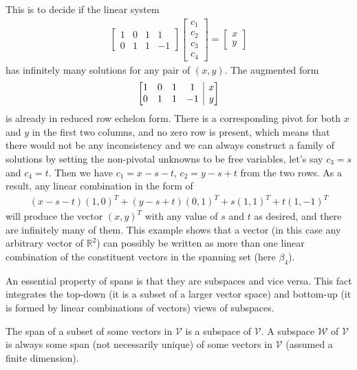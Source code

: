 \begin{solution}
This is to decide if the linear system
\begin{align*}
\begin{bmatrix}
1 & 0 & 1 & 1 \\
0 & 1 & 1 & -1
\end{bmatrix}
\begin{bmatrix}
c_1 \\
c_2 \\
c_3 \\
c_4
\end{bmatrix}
=
\begin{bmatrix}
x \\
y
\end{bmatrix}    
\end{align*}
has infinitely many solutions for any pair of $(x,y)$. The augmented form
\begin{align*}
\left[\begin{array}{@{}cccc|c@{}}
1 & 0 & 1 & 1 & x \\
0 & 1 & 1 & -1 & y
\end{array}\right]
\end{align*}
is already in reduced row echelon form. There is a corresponding pivot for both $x$ and $y$ in the first two columns, and no zero row is present, which means that there would not be any inconsistency and we can always construct a family of solutions by setting the non-pivotal unknowns to be free variables, let's say $c_3 = s$ and $c_4 = t$. Then we have $c_1 = x - s - t$, $c_2 = y - s + t$ from the two rows. As a result, any linear combination in the form of
\begin{align*}
(x-s-t)(1,0)^T + (y-s+t)(0,1)^T + s(1,1)^T + t(1,-1)^T
\end{align*}
will produce the vector $(x,y)^T$ with any value of $s$ and $t$ as desired, and there are infinitely many of them. This example shows that a vector (in this case any arbitrary vector of $\mathbb{R}^2$) can possibly be written as more than one linear combination of the constituent vectors in the spanning set (here $\mathcal{\beta}_4$).
\end{solution}
An essential property of spans is that they are subspaces and vice versa. This fact integrates the top-down (it is a subset of a larger vector space) and bottom-up (it is formed by linear combinations of vectors) views of subspaces.
\begin{proper}
\label{proper:subspace_n_span}
The span of a subset of some vectors in $\mathcal{V}$ is a subspace of $\mathcal{V}$. A subspace $\mathcal{W}$ of $\mathcal{V}$ is always some span (not necessarily unique) of some vectors in $\mathcal{V}$ (assumed a finite dimension).
\end{proper}

